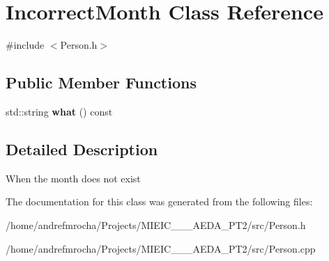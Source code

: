 \hypertarget{class_incorrect_month}{}\section{Incorrect\+Month Class Reference}
\label{class_incorrect_month}


{\ttfamily \#include $<$Person.\+h$>$}

\subsection*{Public Member Functions}
\begin{DoxyCompactItemize}
\item 
\mbox{\label{class_incorrect_month_ab5f69a2380802c07d44f2f1c5e6575ed}} 
std\+::string {\bfseries what} () const
\end{DoxyCompactItemize}


\subsection{Detailed Description}
When the month does not exist 

The documentation for this class was generated from the following files\+:\begin{DoxyCompactItemize}
\item 
/home/andrefmrocha/\+Projects/\+M\+I\+E\+I\+C\+\_\+\_\+\_\+\+A\+E\+D\+A\+\_\+\+P\+T2/src/Person.\+h\item 
/home/andrefmrocha/\+Projects/\+M\+I\+E\+I\+C\+\_\+\_\+\_\+\+A\+E\+D\+A\+\_\+\+P\+T2/src/Person.\+cpp\end{DoxyCompactItemize}
